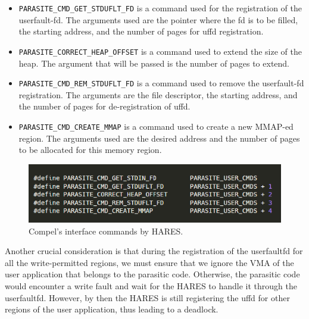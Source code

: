 \documentclass[article, doublespace,nopageskip]{VTthesis} %
\newcommand{\monitor}{HARES }
\begin{document}
    \begin{itemize}
        \item \texttt{PARASITE\_CMD\_GET\_STDUFLT\_FD} is a command used for the registration of the userfault-fd. The arguments used are the pointer where the fd is to be filled, the starting address, and the number of pages for uffd registration.
        \item \texttt{PARASITE\_CORRECT\_HEAP\_OFFSET} is a command used to extend the size of the heap. The argument that will be passed is the number of pages to extend.
        \item \texttt{PARASITE\_CMD\_REM\_STDUFLT\_FD} is a command used to remove the userfault-fd registration. The arguments are the file descriptor, the starting address, and the number of pages for de-registration of uffd.
        \item \texttt{PARASITE\_CMD\_CREATE\_MMAP} is a command used to create a new MMAP-ed region. The arguments used are the desired address and the number of pages to be allocated for this memory region.
    \end{itemize}


    \begin{figure}[htb]
        \centering
        \includegraphics[scale=2.0]{figures/compel-macros.png}
        \caption{Compel's interface commands by HARES.} 
        \label{fig:comple_interface}
    \end{figure}

    Another crucial consideration is that during the registration of the userfaultfd for all the write-permitted regions, we must ensure that we ignore the VMA of the user application that belongs to the parasitic code. Otherwise, the parasitic code would encounter a write fault and wait for the \monitor to handle it through the userfaultfd. However, by then the \monitor is still registering the uffd for other regions of the user application, thus leading  to a deadlock.
\end{document}
